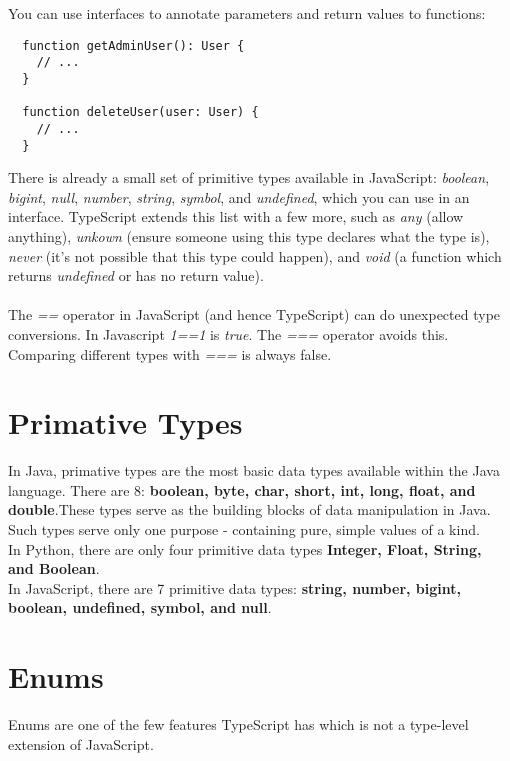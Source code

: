 \documentclass{article}%
\begin{document}
You can use interfaces to annotate parameters and return values to functions:

\begin{lstlisting}
  function getAdminUser(): User {
    // ...
  }

  function deleteUser(user: User) {
    // ...
  }
\end{lstlisting}

There is already a small set of primitive types available in JavaScript: \textit{boolean}, \textit{bigint},
\textit{null}, \textit{number}, \textit{string}, \textit{symbol}, and \textit{undefined}, which you can use in
an interface. TypeScript extends this list with a few more, such as \textit{any} (allow anything), \textit{unkown} (ensure someone using this type declares what the type is), \textit{never} (it's not possible that this type could happen), and \textit{void} (a
function which returns \textit{undefined} or has no return value).  \\ \\

The \textit{==} operator in JavaScript (and hence TypeScript) can do unexpected type conversions. In Javascript \textit{1==1} is \textit{true}. The \textit{===} operator avoids this. Comparing different types with 
\textit{===} is always false.

\section{Primative Types}
In Java, primative types are the most basic data types available within the Java language. There are 8: \textbf{boolean, byte, char, short, int, long, float, and double}.These types serve as the building blocks of data
manipulation in Java. Such types serve only one purpose - containing pure, simple values of a kind. \\ 

In Python, there are only four primitive data types \textbf{Integer, Float, String, and Boolean}. \\

In JavaScript, there are 7 primitive data types: \textbf{string, number, bigint, boolean, undefined, symbol, and null}. 

\section{Enums}
Enums are one of the few features TypeScript has which is not a type-level extension of JavaScript. 
\end{document}
